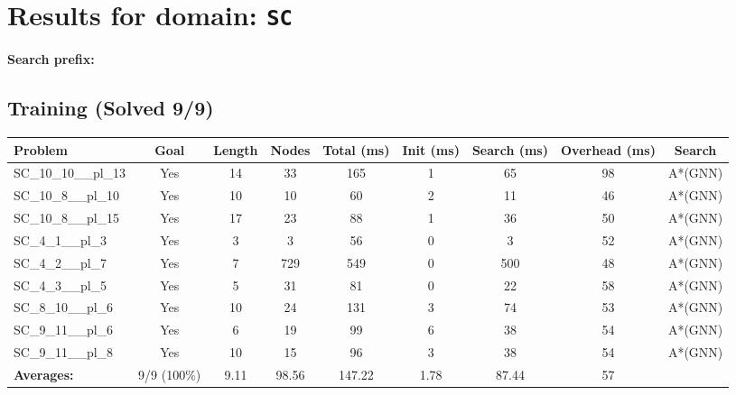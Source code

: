 \documentclass{article}
\begin{document}
\section*{Results for domain: \texttt{SC}}
\textbf{Search prefix:} 
\\[0.5cm]
\subsection*{Training (Solved 9/9)}
\begin{tabular}{lcccccccc}
\toprule
Problem & Goal & Length & Nodes & Total (ms) & Init (ms) & Search (ms) & Overhead (ms) & Search \\
\midrule
SC\_10\_10\_\_pl\_13 & Yes & 14 & 33 & 165 & 1 & 65 & 98 & A*(GNN) \\
SC\_10\_8\_\_pl\_10 & Yes & 10 & 10 & 60 & 2 & 11 & 46 & A*(GNN) \\
SC\_10\_8\_\_pl\_15 & Yes & 17 & 23 & 88 & 1 & 36 & 50 & A*(GNN) \\
SC\_4\_1\_\_pl\_3 & Yes & 3 & 3 & 56 & 0 & 3 & 52 & A*(GNN) \\
SC\_4\_2\_\_pl\_7 & Yes & 7 & 729 & 549 & 0 & 500 & 48 & A*(GNN) \\
SC\_4\_3\_\_pl\_5 & Yes & 5 & 31 & 81 & 0 & 22 & 58 & A*(GNN) \\
SC\_8\_10\_\_pl\_6 & Yes & 10 & 24 & 131 & 3 & 74 & 53 & A*(GNN) \\
SC\_9\_11\_\_pl\_6 & Yes & 6 & 19 & 99 & 6 & 38 & 54 & A*(GNN) \\
SC\_9\_11\_\_pl\_8 & Yes & 10 & 15 & 96 & 3 & 38 & 54 & A*(GNN) \\
\textbf{Averages:} & 9/9 (100\%) & 9.11 & 98.56 & 147.22 & 1.78 & 87.44 & 57 & \\
\bottomrule
\end{tabular}
\\[0.7cm]
\end{document}
